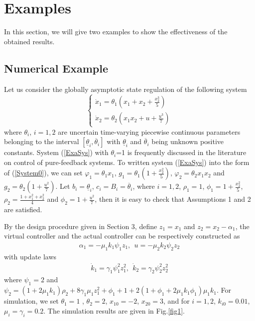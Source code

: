 \documentclass{tSYS2e}
\theoremstyle{plain}
\theoremstyle{definition}
\begin{document}
\section{Examples}
In this section, we will give two examples to show the effectiveness
of the obtained results.

\subsection{Numerical Example}
Let us consider the globally asymptotic state regulation of the following system
\begin{equation}
\left\{
\begin{array}{l}
\dot{x}_{1}=\theta _{1}\left(x_{1}+x_{2}+\frac{x_{2}^{3}}{5}\right) \\
\dot{x}_{2}=\theta _{2}\left(x_{1}x_{2}+u+\frac{u^{3}}{7}\right)
\end{array}
\right.   \label{ExaSys}
\end{equation}
where $\theta _{i}$, $i=1,2$ are uncertain time-varying piecewise continuous parameters belonging to the interval $[\underline{\theta}_i, \overline{\theta}_i]$
with $\underline{\theta}_i$ and $\overline{\theta}_i$ being unknown positive constants. System (\ref{ExaSys}) with $\theta _{i}$=1 is
frequently discussed in the literature on control of pure-feedback systems.
To written system (\ref{ExaSys}) into the form of (\ref{System0}), we can set $\varphi
_{1}=\theta _{1}x_{1}$, $g_{1}=\theta _{1}\left( 1+\frac{x_{2}^{2}}{5}
\right) $, $\varphi _{2}=\theta _{2}x_{1}x_{2}$ and $g_{2}=\theta _{2}\left(
1+\frac{u^{2}}{7}\right) $. Let $b_{i}=\underline{\theta}_i$, $c_{i}=B_{i}=\overline{\theta}_i$, where $i=1,2$, $\rho _{1}=1
$, $\phi _{1}=1+\frac{x_{2}^{2}}{5}$, $\rho
_{2}=\frac{1+x_{1}^{2}+x_{2}^{2}}{4}$ and $\phi _{2}=1+\frac{u^{2}}{7}$,
then it is easy to check that Assumptions 1 and 2 are satisfied.

By the design procedure given in Section 3, define $z_{1}=x_{1}$ and $
z_{2}=x_{2}-\alpha _{1}$, the virtual controller and the actual controller can
be respectively constructed as
\begin{eqnarray*}
\alpha _{1} =-\mu _{1}k_{1}\psi _{1}z_{1},\ \
u =-\mu _{2}k_{2}\psi _{2}z_{2}
\end{eqnarray*}
with update laws
\begin{eqnarray*}
\dot{k}_{1} =\gamma _{1}\psi _{1}^{2}z_{1}^{2},\ \
\dot{k}_{2} =\gamma _{2}\psi _{2}^{2}z_{2}^{2}
\end{eqnarray*}
where $\psi _{1}=2$ and $\psi _{2}=(1+2\mu _{1}k_{1})\rho _{2}+8\gamma _{1}\mu_{1}z_{1}^{2}+\phi _{1}+1
+2\left(1+\phi _{1}+2\mu _{1}k_{1}\phi _{1}\right) \mu _{1}k_{1}$. For simulation, we set $\theta _{1}=1$
, $\theta _{2}=2$, $x_{10}=-2$, $x_{20}=3$, and for $i=1,2$, $k_{i0}=0.01$, $\mu _{i}=\gamma _{i}=0.2$.
The simulation results are given in Fig.\ref{fig1}.
\end{document}
